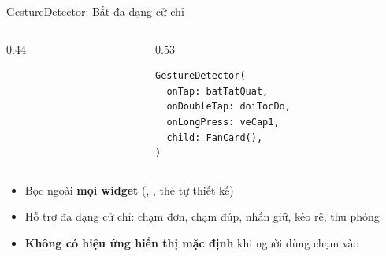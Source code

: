 \documentclass[aspectratio=169, 11pt]{beamer}
\newcommand{\code}[1]{\leavevmode{\ttfamily\color{DarkMain}#1}}
\begin{document}
\begin{frame}[fragile]{GestureDetector: Bắt đa dạng cử chỉ}
  \vspace{0.18cm}
  \begin{columns}[c, onlytextwidth]
    \begin{column}{0.44\textwidth}
      \centering
    \end{column}
    \hfill
    \begin{column}{0.53\textwidth}
      \begin{codepanel}
\begin{Verbatim}[commandchars=§«»,fontsize=\fontsize{8.5pt}{12.3pt}\selectfont]
GestureDetector(
  onTap: batTatQuat,
  onDoubleTap: doiTocDo,
  onLongPress: veCap1,
  child: FanCard(),
)
\end{Verbatim}
      \end{codepanel}
    \end{column}
  \end{columns}

  \vspace{0.38cm}
  \begin{itemize}\setlength{\itemsep}{0.22cm}
    \item Bọc ngoài \textbf{mọi widget} (\code{Container}, \code{Image}, thẻ tự thiết kế)
    \item Hỗ trợ đa dạng cử chỉ: chạm đơn, chạm đúp, nhấn giữ, kéo rê, thu phóng
    \item \textbf{Không có hiệu ứng hiển thị mặc định} khi người dùng chạm vào
  \end{itemize}
\end{frame}
\end{document}
